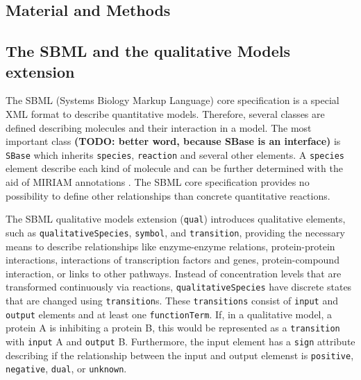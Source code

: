 \documentclass{bioinfo}
\newcommand{\qual}{\texttt{qual}}
\begin{document}
\begin{methods}
\section{Material and Methods}
\subsection{The SBML and the qualitative Models extension}
The SBML (Systems Biology Markup Language) core specification is a special XML format to describe quantitative models. Therefore, several classes are defined describing molecules and their interaction in a model.
The most important class \textbf{(TODO: better word, because SBase is an interface)} is \texttt{SBase} which inherits \texttt{species}, \texttt{reaction} and several other elements.
A \texttt{species} element describe each kind of molecule and can be further determined with the aid of MIRIAM annotations \citep{Juty2012}.
The SBML core specification provides no possibility to define other relationships than concrete quantitative reactions. \citep{Hucka2003}

The SBML qualitative models extension (\qual) introduces qualitative elements, such as \texttt{qualitativeSpecies}, \texttt{symbol}, and \texttt{transition}, providing the necessary means to describe relationships like enzyme-enzyme relations, protein-protein interactions, interactions of transcription factors and genes, protein-compound interaction, or links to other pathways.
Instead of concentration levels that are transformed continuously via reactions, \texttt{qualitativeSpecies} have discrete states that are changed using \texttt{transition}s.
These \texttt{transitions} consist of \texttt{input} and \texttt{output} elements and at least one \texttt{functionTerm}.
If, in a qualitative model, a protein A is inhibiting a protein B, this would be represented as a \texttt{transition} with \texttt{input} A and \texttt{output} B.
Furthermore, the input element has a \texttt{sign} attribute describing if the relationship between the input and output elemenst is \texttt{positive}, \texttt{negative}, \texttt{dual}, or \texttt{unknown}.

\end{methods}
\end{document}
